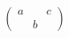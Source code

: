 \documentclass{article}
\begin{document}
\[
\begin{pmatrix}
a &   & c \\
  & b &  
\end{pmatrix}
\]
\end{document}
